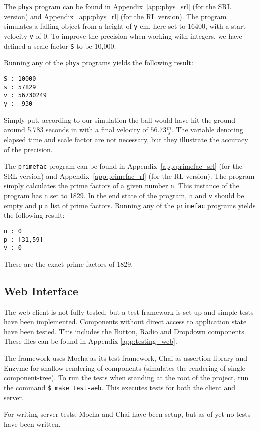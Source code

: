 The \texttt{phys} program can be found in Appendix~\ref{app:phys_srl} (for the SRL version) and Appendix~\ref{app:phys_rl} (for the RL version).
The program simulates a falling object from a height of \texttt{y} cm, here set to 16400, with a start velocity \texttt{v} of 0. To improve the precision when working with integers, we have defined a scale factor \texttt{S} to be 10,000.

Running any of the \texttt{phys} programs yields the following result:
\begin{verbatim}
S : 10000
s : 57829
v : 56730249
y : -930
\end{verbatim}
Simply put, according to our simulation the ball would have hit the ground around 5.783 seconds in with a final velocity of $56.73 \frac{m}{s}$. The variable denoting elapsed time and scale factor are not necessary, but they illustrate the accuracy of the precision.


The \texttt{primefac} program can be found in Appendix~\ref{app:primefac_srl} (for the SRL version) and Appendix~\ref{app:primefac_rl} (for the RL version). The program simply calculates the prime factors of a given number \texttt{n}. This instance of the program has \texttt{n} set to 1829. In the end state of the program, \texttt{n} and \texttt{v} should be empty and \texttt{p} a list of prime factors. Running any of the \texttt{primefac} programs yields the following result:
\begin{verbatim}
n : 0
p : [31,59]
v : 0
\end{verbatim}
These are the exact prime factors of 1829.

\subsection{Web Interface}

The web client is not fully tested, but a test framework is set up and simple tests have been implemented. Components without direct access to application state have been tested. This includes the Button, Radio and Dropdown components.
These files can be found in Appendix \ref{app:testing_web}.

The framework uses Mocha as its test-framework, Chai as assertion-library and Enzyme for shallow-rendering of components (simulates the rendering of single component-tree).
To run the tests when standing at the root of the project, run the command \texttt{\$ make test-web}.
This executes tests for both the client and server.

For writing server tests, Mocha and Chai have been setup, but as of yet no tests have been written.


